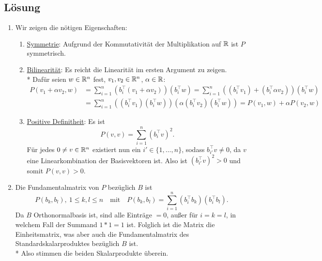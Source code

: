 \subsection{Lösung}
\begin{enumerate}
	\item Wir zeigen die nötigen Eigenschaften:
		\begin{enumerate}
		 	\item \underline{Symmetrie}: Aufgrund der Kommutativität der Multiplikation auf \( \mathbb{R} \) ist \( P \) symmetrisch.
		 	\item \underline{Bilinearität}: Es reicht die Linearität im ersten Argument zu zeigen. \\* Dafür seien \( w \in \mathbb{R}^n \) fest, \( v_1, v_2 \in \mathbb{R}^n \), \( \alpha \in \mathbb{R} \):
		 		\begin{align*}
		 			P(v_1 + \alpha v_2, w) &= \sum_{i=1}^n(b_i^\top(v_1 + \alpha v_2))(b_i^\top w) = \sum_{i=1}^n\left( (b_i^\top v_1) + (b_i^\top \alpha v_2) \right)(b_i^\top w) \\
		 			 &= \sum_{i=1}^n \left( (b_i^\top v_1)(b_i^\top w) \right)\left( \alpha(b_i^\top v_2)(b_i^\top w) \right) = P(v_1, w) + \alpha P(v_2,w)
		 		\end{align*}
		 	\item \underline{Positive Definitheit}: Es ist
		 		\begin{equation*}
		 			P(v,v) = \sum_{i=1}^n (b_i^\top v)^2\text{.}
		 		\end{equation*}
		 		Für jedes \( 0 \neq v \in \mathbb{R}^n \) existiert nun ein \( i' \in \{ 1, \dots, n \} \), sodass \( b_{i'}^\top v \neq 0 \), da \( v \) eine Linearkombination der Basisvektoren ist. Also ist \( (b_{i'}^\top v)^2 > 0 \) und somit \( P(v,v) > 0 \). 
		 \end{enumerate} 

	\item Die Fundamentalmatrix von \( P \) bezüglich \( B \) ist
	\begin{equation*}
		P(b_k, b_l), \ 1 \leq k,l \leq n \quad \text{mit} \quad P(b_k,b_l) = \sum_{i=1}^n (b_i^\top b_k)(b_i^\top b_l)\text{.}
	\end{equation*}
	Da \( B \) Orthonormalbasis ist, sind alle Einträge \( =0 \), außer für \( i=k=l \), in welchem Fall der Summand \( 1*1=1 \) ist. Folglich ist die Matrix die Einheitsmatrix, was aber auch die Fundamentalmatrix des Standardskalarproduktes bezüglich \( B \) ist.
	\\*
	Also stimmen die beiden Skalarprodukte überein.
\end{enumerate}

